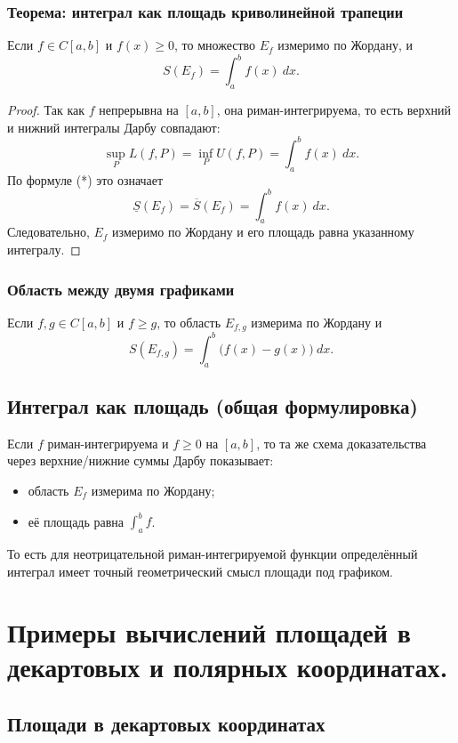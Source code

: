 \documentclass[14pt]{extreport}
\begin{document}
    \subsection{Теорема: интеграл как площадь криволинейной трапеции}
    \begin{theorem}
        Если $f \in C[a,b]$ и $f(x) \geq 0$, то множество $E_f$ измеримо по Жордану, и
        \[
        S(E_f) = \int_a^b f(x)\ dx.
        \]
    \end{theorem}
    \begin{proof}
        Так как $f$ непрерывна на $[a,b]$, она риман-интегрируема, то есть верхний и нижний интегралы Дарбу совпадают:
        \[
        \sup_P L(f,P) = \inf_P U(f,P) = \int_a^b f(x)\ dx.
        \]
        По формуле (*) это означает
        \[
        \underline{S}(E_f) = \overline{S}(E_f) = \int_a^b f(x)\ dx.
        \]
        Следовательно, $E_f$ измеримо по Жордану и его площадь равна указанному интегралу.
    \end{proof}

    \subsection{Область между двумя графиками}
    Если $f,g \in C[a,b]$ и $f \geq g$, то область $E_{f,g}$ измерима по Жордану и
    \[
    S(E_{f,g}) = \int_a^b \bigl( f(x)-g(x) \bigr)\ dx.
    \]

    \section{Интеграл как площадь (общая формулировка)}
    Если $f$ риман-интегрируема и $f \geq 0$ на $[a,b]$, то та же схема доказательства через верхние/нижние суммы Дарбу показывает:
    \begin{itemize}
        \item область $E_f$ измерима по Жордану;
        \item её площадь равна $\int_a^b f$.
    \end{itemize}
    То есть для неотрицательной риман-интегрируемой функции определённый интеграл имеет точный геометрический смысл площади под графиком.


    \chapter{Примеры вычислений площадей в декартовых и полярных координатах.}

    \section{Площади в декартовых координатах}
\end{document}
